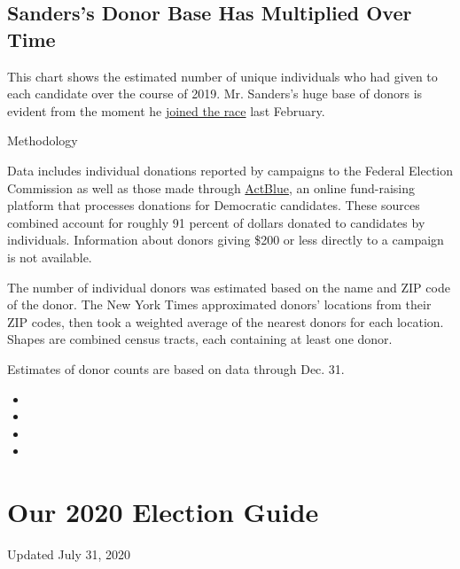 \hypertarget{sanderss-donor-base-has-multiplied-over-time}{%
\subsection{Sanders's Donor Base Has Multiplied Over
Time}\label{sanderss-donor-base-has-multiplied-over-time}}

This chart shows the estimated number of unique individuals who had
given to each candidate over the course of 2019. Mr. Sanders's huge base
of donors is evident from the moment he
\href{https://www.nytimes.com/2019/02/19/us/politics/bernie-sanders-2020.html}{joined
the race} last February.

Methodology

Data includes individual donations reported by campaigns to the Federal
Election Commission as well as those made through
\href{https://www.fec.gov/data/committee/C00401224/}{ActBlue}, an online
fund-raising platform that processes donations for Democratic
candidates. These sources combined account for roughly 91 percent of
dollars donated to candidates by individuals. Information about donors
giving \$200 or less directly to a campaign is not available.

The number of individual donors was estimated based on the name and ZIP
code of the donor. The New York Times approximated donors' locations
from their ZIP codes, then took a weighted average of the nearest donors
for each location. Shapes are combined census tracts, each containing at
least one donor.

Estimates of donor counts are based on data through Dec. 31.

\begin{itemize}
\item
\item
\item
\item
\end{itemize}

\hypertarget{our-2020-election-guide}{%
\section{Our 2020 Election Guide}\label{our-2020-election-guide}}

Updated July 31, 2020


